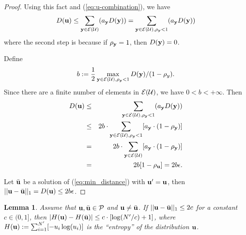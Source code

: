 \documentclass{IEEEtran}
\newtheorem{lemma}{Lemma}
\begin{document}
\begin{proof}
Using this fact and (\ref{eq:u-combination}), we have\begin{equation}
D({\bf u})\le\sum_{{\bf y}\in{\cal E}({\cal U})}(a_{{\bf y}}D({\bf y}))=\sum_{{\bf y}\in{\cal E}({\cal U}),\rho_{{\bf y}}<1}(a_{{\bf y}}D({\bf y}))\label{eq:distance-bound}\end{equation}
where the second step is because if $\rho_{{\bf y}}=1$, then $D({\bf y})=0$.

Define \begin{equation}
b:=\frac{1}{2}\max_{{\bf y}\in{\cal E}({\cal U}),\rho_{{\bf y}}<1}D({\bf y})/(1-\rho_{y}).\label{eq:b}\end{equation}
Since there are a finite number of elements in ${\cal E}({\cal U})$,
we have $0<b<+\infty$. Then \begin{eqnarray*}
D({\bf u}) & \le & \sum_{{\bf y}\in{\cal E}({\cal U}),\rho_{{\bf y}}<1}(a_{{\bf y}}D({\bf y}))\\
 & \le & 2b\cdot\sum_{{\bf y}\in{\cal E}({\cal U}),\rho_{{\bf y}}<1}[a_{{\bf y}}\cdot(1-\rho_{{\bf y}})]\\
 & = & 2b\cdot\sum_{{\bf y}\in{\cal E}({\cal U})}[a_{{\bf y}}\cdot(1-\rho_{{\bf y}})]\\
 & = & 2b[1-\rho_{{\bf u}}]=2b\epsilon.\end{eqnarray*}


Let $\bar{{\bf u}}$ be a solution of (\ref{eq:min_distance}) with
${\bf u}'={\bf u}$, then $||{\bf u}-\bar{{\bf u}}||_{1}=D({\bf u})\le2b\epsilon$. \end{proof}
\begin{lemma}
\label{lem:entropy-bound}Assume that ${\bf u},\bar{{\bf u}}\in{\cal P}$
and ${\bf u}\ne\bar{{\bf u}}$. If $||{\bf u}-\bar{{\bf u}}||_{1}\le2c$
for a constant $c\in(0,1]$, then $|H({\bf u})-H(\bar{{\bf u}})|\le c\cdot[\log(N'/c)+1]$,
where $H({\bf u}):=\sum_{i=1}^{N'}[-u_{i}\log(u_{i})]$ is the {}``entropy''
of the distribution ${\bf u}$.\end{lemma}
\end{document}
